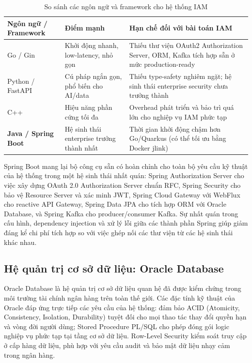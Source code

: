 \documentclass[../DoAn.tex]{subfiles}
\begin{document}
\begin{table}[H]
\centering
\caption{So sánh các ngôn ngữ và framework cho hệ thống IAM}
\label{tab:lang-comparison}
\begin{tabular}{|p{2.8cm}|p{4cm}|p{6.5cm}|}
\hline
\textbf{Ngôn ngữ / Framework} & \textbf{Điểm mạnh} & \textbf{Hạn chế đối với bài toán IAM} \\
\hline
Go / Gin & Khởi động nhanh, low-latency, nhỏ gọn & Thiếu thư viện OAuth2 Authorization Server, ORM, Kafka tích hợp sẵn ở mức production-ready \\
\hline
Python / FastAPI & Cú pháp ngắn gọn, phổ biến cho AI/data & Thiếu type-safety nghiêm ngặt; hệ sinh thái enterprise security chưa trưởng thành \\
\hline
C++ & Hiệu năng phần cứng tối đa & Overhead phát triển và bảo trì quá lớn cho nghiệp vụ IAM phức tạp \\
\hline
\textbf{Java / Spring Boot} & Hệ sinh thái enterprise trưởng thành nhất & Thời gian khởi động chậm hơn Go/Quarkus (có thể tối ưu bằng Docker jlink) \\
\hline
\end{tabular}
\end{table}

Spring Boot mang lại bộ công cụ sẵn có hoàn chỉnh cho toàn bộ yêu cầu kỹ thuật của hệ thống trong một hệ sinh thái nhất quán: Spring Authorization Server cho việc xây dựng OAuth 2.0 Authorization Server chuẩn RFC, Spring Security cho bảo vệ Resource Server và xác minh JWT, Spring Cloud Gateway với WebFlux cho reactive API Gateway, Spring Data JPA cho tích hợp ORM với Oracle Database, và Spring Kafka cho producer/consumer Kafka. Sự nhất quán trong cấu hình, dependency injection và xử lý lỗi giữa các thành phần Spring giúp giảm đáng kể chi phí tích hợp so với việc ghép nối các thư viện từ các hệ sinh thái khác nhau.

\subsection{Hệ quản trị cơ sở dữ liệu: Oracle Database}
\label{subsection:3.2.2}

Oracle Database là hệ quản trị cơ sở dữ liệu quan hệ đã được kiểm chứng trong môi trường tài chính ngân hàng trên toàn thế giới. Các đặc tính kỹ thuật của Oracle đáp ứng trực tiếp các yêu cầu của hệ thống: đảm bảo ACID (Atomicity, Consistency, Isolation, Durability) tuyệt đối cho mọi thao tác thay đổi quyền hạn và vòng đời người dùng; Stored Procedure PL/SQL cho phép đóng gói logic nghiệp vụ phức tạp tại tầng cơ sở dữ liệu. Row-Level Security kiểm soát truy cập ở cấp hàng dữ liệu, phù hợp với yêu cầu audit và bảo mật dữ liệu nhạy cảm trong ngân hàng.
\end{document}
